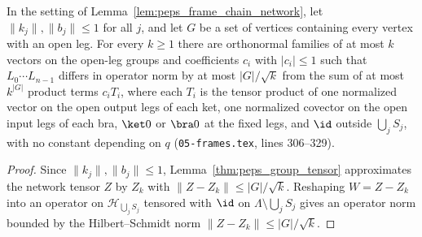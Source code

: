 \begin{lemma}
    \label{lem:peps_frame_chain_truncation}
    \leanok
    In the setting of Lemma~\ref{lem:peps_frame_chain_network}, let $\lVert k_j\rVert,\lVert b_j\rVert\le1$ for all $j$, and let $G$ be a set of vertices containing every vertex
    with an open leg. For every $k\ge1$ there are orthonormal families of at
    most $k$ vectors on the open-leg groups and coefficients $c_i$ with $\lvert c_i\rvert\le1$
    such that $L_0\cdots L_{n-1}$ differs in operator norm by at most
    $\lvert G\rvert/\sqrt k$ from the sum of at most $k^{\lvert G\rvert}$ product terms $c_i T_i$, where each $T_i$ is the tensor product of
    one normalized vector on the open output legs of each ket, one
    normalized covector on the open input legs of each bra, $\ket0$ or $\bra0$ at the fixed legs, and $\id$ outside $\bigcup_j S_j$, with no constant depending on $q$
    (\texttt{05-frames.tex}, lines 306--329).
\end{lemma}

\begin{proof}\leanok
    Since $\lVert k_j\rVert,\lVert b_j\rVert\le1$, Lemma~\ref{thm:peps_group_tensor}
    approximates the network tensor $Z$ by $Z_k$ with $\lVert Z-Z_k\rVert\le\lvert G\rvert/\sqrt k$. Reshaping $W=Z-Z_k$ into an operator on $\mathcal H_{\bigcup_j S_j}$ tensored with $\id$ on $\Lambda\setminus\bigcup_j S_j$ gives an operator norm bounded by the Hilbert--Schmidt norm $\lVert Z-Z_k\rVert\le\lvert G\rvert/\sqrt k$.
\end{proof}

